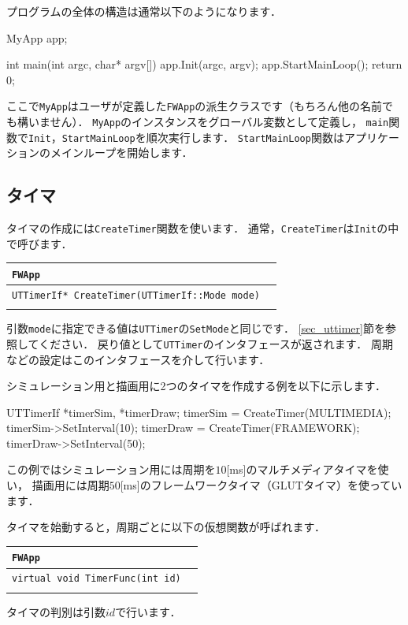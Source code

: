 \KLUDGE プログラムの全体の構造は通常以下のようになります．

\begin{sourcecode}
MyApp app;

int main(int argc, char* argv[]){
    app.Init(argc, argv);
    app.StartMainLoop();
    return 0;
}
\end{sourcecode}

\KLUDGE ここで\texttt{MyApp}はユーザが定義した\texttt{FWApp}の派生クラスです（もちろん他の名前でも構いません）．
\texttt{MyApp}のインスタンスをグローバル変数として定義し，
\texttt{main}関数で\texttt{Init}，\texttt{StartMainLoop}を順次実行します．
\texttt{StartMainLoop}関数はアプリケーションのメインループを開始します．


\subsection*{タイマ}

\KLUDGE タイマの作成には\texttt{CreateTimer}関数を使います．
\KLUDGE 通常，\texttt{CreateTimer}は\texttt{Init}の中で呼びます．

\noindent
\begin{tabular}{p{.7\hsize}p{.2\hsize}}
\\
\texttt{FWApp}												\\ \midrule
\texttt{UTTimerIf* CreateTimer(UTTimerIf::Mode mode)}	&	\\
\\
\end{tabular}

\KLUDGE 引数\texttt{mode}に指定できる値は\texttt{UTTimer}の\texttt{SetMode}と同じです．
\ref{sec_uttimer}節を参照してください．
\KLUDGE 戻り値として\texttt{UTTimer}のインタフェースが返されます．
\KLUDGE 周期などの設定はこのインタフェースを介して行います．

\KLUDGE シミュレーション用と描画用に2つのタイマを作成する例を以下に示します．
\begin{sourcecode}
UTTimerIf *timerSim, *timerDraw;
timerSim = CreateTimer(MULTIMEDIA);
timerSim->SetInterval(10);
timerDraw = CreateTimer(FRAMEWORK);
timerDraw->SetInterval(50);
\end{sourcecode}
\KLUDGE この例ではシミュレーション用には周期を$10$[ms]のマルチメディアタイマを使い，
\KLUDGE 描画用には周期$50$[ms]のフレームワークタイマ（GLUTタイマ）を使っています．

\KLUDGE タイマを始動すると，周期ごとに以下の仮想関数が呼ばれます．

\noindent
\begin{tabular}{p{.7\hsize}p{.2\hsize}}
\\
\texttt{FWApp}								\\ \midrule
\texttt{virtual void TimerFunc(int id)}	&	\\
\\
\end{tabular}
\KLUDGE タイマの判別は引数$id$で行います．

